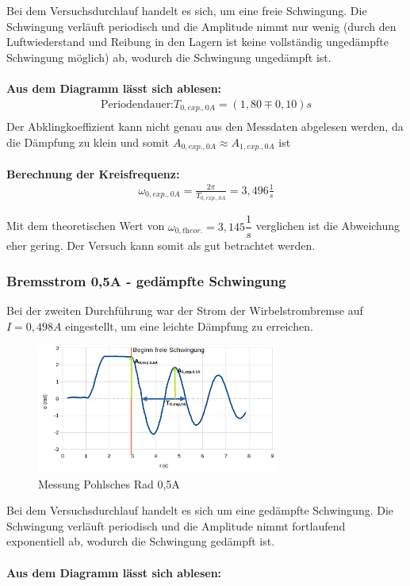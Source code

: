 \documentclass[a4paper]{scrartcl}
\numberwithin{equation}{subsection}
\begin{document}
Bei dem Versuchsdurchlauf handelt es sich, um eine freie Schwingung. Die Schwingung verläuft periodisch und die Amplitude nimmt nur wenig (durch den Luftwiederstand und Reibung in den Lagern ist keine vollständig ungedämpfte Schwingung möglich) ab, wodurch die Schwingung ungedämpft ist.
\\ \\
\textbf{Aus dem Diagramm lässt sich ablesen:}
\begin{align*}
\text{Periodendauer:} T_{0,\textit{exp.},0A} = (1,80\mp0,10)s \\
\end{align*}
Der Abklingkoeffizient kann nicht genau aus den Messdaten abgelesen werden, da die Dämpfung zu klein und somit $A_{0,\textit{exp.},0A} \approx A_{1,\textit{exp.},0A}$ ist
\\ \\
\textbf{Berechnung der Kreisfrequenz:}
\begin{align}
\omega_{0,\textit{exp.},0A} = \frac{2\pi}{T_{0,\textit{exp.},0A}} = 3,496 \frac{1}{s}
\end{align}

Mit dem theoretischen Wert von $\omega_{0,\textit{theor.}} = 3,145 \dfrac{1}{s}$ verglichen ist die Abweichung eher gering. Der Versuch kann somit als gut betrachtet werden.


\subsubsection{Bremsstrom 0,5A - gedämpfte Schwingung}
Bei der zweiten Durchführung war der Strom der Wirbelstrombremse auf $I = 0,498A$ eingestellt, um eine leichte Dämpfung zu erreichen.

\begin{figure}[H]
\includegraphics[width=8cm]{Messung_Rad_graph_05A}
\centering
\caption{Messung Pohlsches Rad 0,5A}
\centering
\end{figure}

Bei dem Versuchsdurchlauf handelt es sich um eine gedämpfte Schwingung. Die Schwingung verläuft periodisch und die Amplitude nimmt fortlaufend exponentiell ab, wodurch die Schwingung gedämpft ist.
\\ \\
\textbf{Aus dem Diagramm lässt sich ablesen:}
\end{document}
